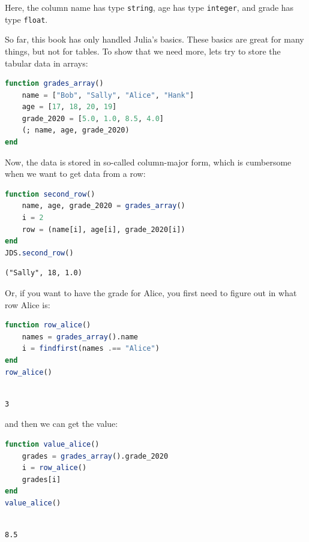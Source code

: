 \documentclass[
  notoc %
]{tufte-book}
\newcommand{\passthrough}[1]{#1}
\begin{document}
Here, the column name has type \passthrough{\lstinline!string!}, age has
type \passthrough{\lstinline!integer!}, and grade has type
\passthrough{\lstinline!float!}.

So far, this book has only handled Julia's basics. These basics are
great for many things, but not for tables. To show that we need more,
lets try to store the tabular data in arrays:

\begin{lstlisting}[language=Julia]
function grades_array()
    name = ["Bob", "Sally", "Alice", "Hank"]
    age = [17, 18, 20, 19]
    grade_2020 = [5.0, 1.0, 8.5, 4.0]
    (; name, age, grade_2020)
end
\end{lstlisting}

Now, the data is stored in so-called column-major form, which is
cumbersome when we want to get data from a row:

\begin{lstlisting}[language=Julia]
function second_row()
    name, age, grade_2020 = grades_array()
    i = 2
    row = (name[i], age[i], grade_2020[i])
end
JDS.second_row()
\end{lstlisting}

\begin{lstlisting}[language=Output]
("Sally", 18, 1.0)
\end{lstlisting}

Or, if you want to have the grade for Alice, you first need to figure
out in what row Alice is:

\begin{lstlisting}[language=Julia]
function row_alice()
    names = grades_array().name
    i = findfirst(names .== "Alice")
end
row_alice()
\end{lstlisting}

\begin{lstlisting}[language=Output]

3

\end{lstlisting}

and then we can get the value:

\begin{lstlisting}[language=Julia]
function value_alice()
    grades = grades_array().grade_2020
    i = row_alice()
    grades[i]
end
value_alice()
\end{lstlisting}

\begin{lstlisting}[language=Output]

8.5

\end{lstlisting}
\end{document}
